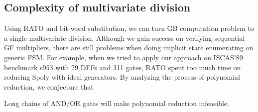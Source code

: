 \subsection{Complexity of multivariate division}
Using RATO and bit-word substitution, we can turn GB computation problem to a single multivariate division.
Although we gain success on verifying sequential GF multipliers, there are still problems when
doing implicit state enumerating on generic FSM. For example, when we tried to apply our approach
on ISCAS'89 benchmark s953 with 29 DFFs and 311 gates, RATO spent too much time on reducing
Spoly with ideal generators. By analyzing the process of polynomial reduction, we conjecture that
\begin{Conjecture}
Long chains of AND/OR gates will make polynomial reduction infeasible.
\end{Conjecture}

\begin{figure}[hbt]
\end{figure}

